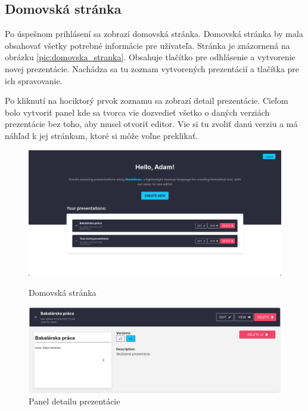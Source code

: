 \subsection*{Domovská stránka}
Po úspešnom prihlásení sa zobrazí domovská stránka. Domovská stránka by mala obsahovať všetky potrebné informácie pre užívateľa. Stránka je znázornená na obrázku \ref{pic:domovska_stranka}. Obsahuje tlačítko pre odhlásenie a vytvorenie novej prezentácie. Nachádza sa tu zoznam vytvorených prezentácií a tlačítka pre ich spravovanie. 

Po kliknutí na hociktorý prvok zoznamu sa zobrazí detail prezentácie. Cieľom bolo vytvoriť panel kde sa tvorca vie dozvedieť všetko o daných verziách prezentácie bez toho, aby musel otvoriť editor. Vie si tu zvoliť danú verziu a má náhľad k jej stránkam, ktoré si môže voľne preklikať.

\begin{figure}[!hbt]
\centering
\begin{minipage}{.5\textwidth}
  \centering
  \includegraphics[scale=0.1]{obrazky/domovska_stranka.png}
  \caption{Domovská stránka}
  \label{pic:domovska_stranka}
\end{minipage}%
\begin{minipage}{.5\textwidth}
  \centering
  \includegraphics[scale=0.15]{obrazky/detail_prezentacie.png}
  \caption{Panel detailu prezentácie}
  \label{pic:detail_prezentacie}
\end{minipage}
\end{figure}

